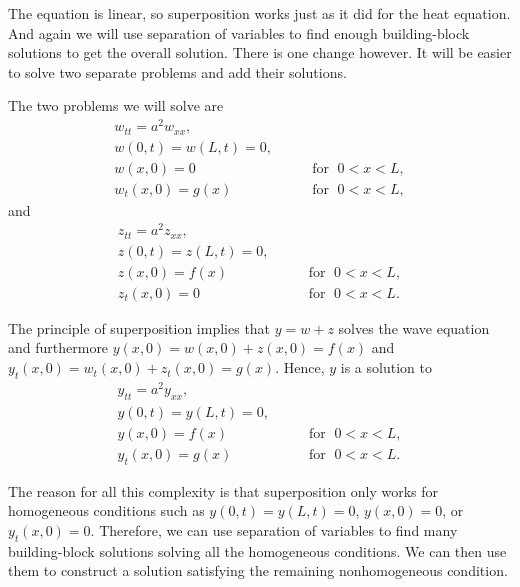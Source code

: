 The equation is linear, so superposition works just as it did for the
heat equation.  And again we will use separation of variables to find
enough building-block solutions to get the overall solution.  There is
one change however.  It will be easier to solve two separate problems
and add their solutions.

The two problems we will solve are
\begin{equation} \label{wave:weq}
\begin{array}{ll}
w_{tt} = a^2 w_{xx} , &  \\
w(0,t) = w(L,t) = 0 , &  \\
w(x,0) = 0 & \qquad \text{for } \; 0 < x < L , \\
w_t(x,0) = g(x) & \qquad \text{for } \; 0 < x < L ,
\end{array}
\end{equation}
and
\begin{equation} \label{wave:zeq}
\begin{array}{ll}
z_{tt} = a^2 z_{xx} , &  \\
z(0,t) = z(L,t) = 0 , &  \\
z(x,0) = f(x) & \qquad \text{for } \; 0 < x < L , \\
z_t(x,0) = 0 & \qquad \text{for } \; 0 < x < L .
\end{array}
\end{equation}

The principle of superposition implies that
$y = w + z$ solves the wave equation and furthermore
$y(x,0) = w(x,0) + z(x,0) = f(x)$ and
$y_t(x,0) = w_t(x,0) + z_t(x,0) = g(x)$.  Hence, $y$ is
a solution to
\begin{equation} \label{wave:yeq}
\begin{array}{ll}
y_{tt} = a^2 y_{xx} , &  \\
y(0,t) = y(L,t) = 0 , &  \\
y(x,0) = f(x) & \qquad \text{for } \; 0 < x < L , \\
y_t(x,0) = g(x) & \qquad \text{for } \; 0 < x < L .
\end{array}
\end{equation}

The reason for all this complexity is that superposition only works for
homogeneous conditions such as
$y(0,t) = y(L,t) = 0$, $y(x,0) = 0$, or $y_t(x,0) = 0$.  Therefore,
we can
use separation of variables to find many building-block
solutions solving all the homogeneous conditions.  We can then use them to
construct a solution satisfying the remaining nonhomogeneous condition.

